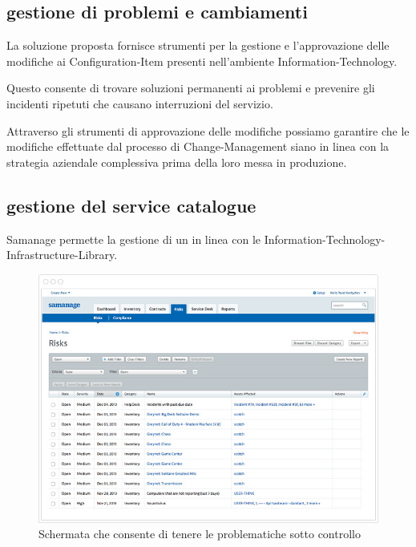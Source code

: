 \subsection[Gestione di problemi e cambiamenti]{gestione di problemi e cambiamenti}
\label{sd-problem-change-management}
La soluzione  proposta fornisce strumenti per la gestione e l'approvazione delle modifiche ai \ac{Configuration-Item} presenti nell'ambiente \acs{Information-Technology}.

Questo consente di trovare soluzioni permanenti ai problemi e prevenire gli incidenti ripetuti che causano interruzioni del servizio.

Attraverso gli strumenti di approvazione delle modifiche possiamo garantire che le modifiche effettuate dal processo di \ac{Change-Management} siano in linea con la strategia aziendale complessiva prima della loro messa in produzione.

\subsection[Gestione del service catalogue]{gestione del service catalogue}
\label{sd-service-catalogue-management}
Samanage permette la gestione di un  in linea con le  \ac{Information-Technology-Infrastructure-Library}.

\begin{figure}[htbp]
\centering
\includegraphics[scale=0.6]{Images/samanage/Risk_management.png}
\caption{Schermata che consente di tenere le problematiche sotto controllo}
\label{sd-samanage-service-catalogue-img}
\end{figure}

